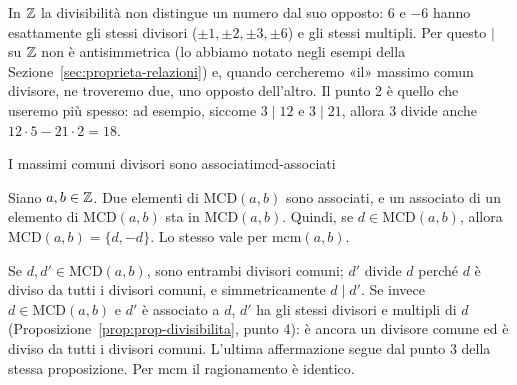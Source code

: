 \begin{spiegazione}
    In $\mathbb{Z}$ la divisibilità non distingue un numero dal suo opposto: $6$ e $-6$ hanno esattamente gli stessi divisori
    ($\pm 1, \pm 2, \pm 3, \pm 6$) e gli stessi multipli. Per questo $\mid$ su $\mathbb{Z}$ non è antisimmetrica (lo abbiamo notato
    negli esempi della Sezione~\ref{sec:proprieta-relazioni}) e, quando cercheremo «il» massimo comun divisore, ne troveremo due, uno opposto dell'altro. Il punto 2 è quello
    che useremo più spesso: ad esempio, siccome $3 \mid 12$ e $3 \mid 21$, allora $3$ divide anche $12 \cdot 5 - 21 \cdot 2 = 18$.
\end{spiegazione}


\begin{concetto}
\begin{Proposizione}{I massimi comuni divisori sono associati}{mcd-associati}
    \begin{prerequisiti}
    \end{prerequisiti}
    Siano $a, b \in \mathbb{Z}$. Due elementi di $\mathrm{MCD}(a, b)$ sono associati, e un associato di un elemento di $\mathrm{MCD}(a, b)$ sta in
    $\mathrm{MCD}(a, b)$. Quindi, se $d \in \mathrm{MCD}(a, b)$, allora $\mathrm{MCD}(a, b) = \{d, -d\}$. Lo stesso vale per $\mathrm{mcm}(a, b)$.
\end{Proposizione}
\begin{dimostrazione}
    Se $d, d' \in \mathrm{MCD}(a, b)$, sono entrambi divisori comuni; $d'$ divide $d$ perché $d$ è diviso da tutti i divisori comuni, e
    simmetricamente $d \mid d'$. Se invece $d \in \mathrm{MCD}(a, b)$ e $d'$ è associato a $d$, $d'$ ha gli stessi divisori e multipli di $d$
    (Proposizione~\ref{prop:prop-divisibilita}, punto 4): è ancora un divisore comune ed è diviso da tutti i divisori comuni. L'ultima
    affermazione segue dal punto 3 della stessa proposizione. Per $\mathrm{mcm}$ il ragionamento è identico.
\end{dimostrazione}
\end{concetto}


